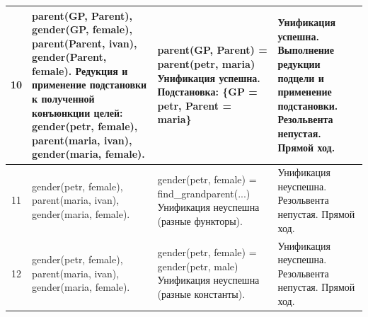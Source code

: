 \begin{tabularx}{\textwidth}{|c|>{\small}X|>{\small}X|>{\small}X|}
	10                                                                                 &
	parent(GP, Parent), \newline
	gender(GP, female), \newline
	parent(Parent, ivan), \newline
	gender(Parent, female). \newline
	Редукция и применение подстановки к полученной конъюнкции целей: \newline
	gender(petr, female), \newline
	parent(maria, ivan), \newline
	gender(maria, female).                                                             &
	parent(GP, Parent) = \newline
	parent(petr, maria) \newline
	Унификация успешна. \newline
	Подстановка: \newline
	\{GP = petr, Parent = maria\}                                                      &
	Унификация успешна. \newline
	Выполнение редукции подцели и применение подстановки.
	Резольвента непустая. \newline
	Прямой ход.                                                                                  \\
	\hline

	11                                                                                 &
	gender(petr, female), \newline
	parent(maria, ivan), \newline
	gender(maria, female).                                                             &
	gender(petr, female) = \newline
	find\_grandparent(...) \newline
	Унификация неуспешна (разные функторы).                                            &
	Унификация неуспешна. \newline
	Резольвента непустая. \newline
	Прямой ход.                                                                                  \\
	\hline

	12                                                                                 &
	gender(petr, female), \newline
	parent(maria, ivan), \newline
	gender(maria, female).                                                             &
	gender(petr, female) = \newline
	gender(petr, male) \newline
	Унификация неуспешна (разные константы).                                           &
	Унификация неуспешна. \newline
	Резольвента непустая. \newline
	Прямой ход.                                                                                  \\
	\hline


\end{tabularx}

